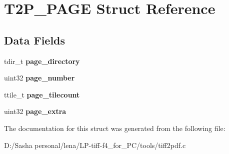 \hypertarget{struct_t2_p___p_a_g_e}{}\section{T2\+P\+\_\+\+P\+A\+G\+E Struct Reference}
\label{struct_t2_p___p_a_g_e}
\subsection*{Data Fields}
\begin{DoxyCompactItemize}
\item 
\hypertarget{struct_t2_p___p_a_g_e_a7df7149b509161de6a47a29b2ddf42d3}{}tdir\+\_\+t {\bfseries page\+\_\+directory}\label{struct_t2_p___p_a_g_e_a7df7149b509161de6a47a29b2ddf42d3}

\item 
\hypertarget{struct_t2_p___p_a_g_e_af5f8d04c2416529f3fe1f40c306dfa3b}{}uint32 {\bfseries page\+\_\+number}\label{struct_t2_p___p_a_g_e_af5f8d04c2416529f3fe1f40c306dfa3b}

\item 
\hypertarget{struct_t2_p___p_a_g_e_a6b85db7be288aca43218e10746cd5ce4}{}ttile\+\_\+t {\bfseries page\+\_\+tilecount}\label{struct_t2_p___p_a_g_e_a6b85db7be288aca43218e10746cd5ce4}

\item 
\hypertarget{struct_t2_p___p_a_g_e_a5fa32b5073d7163cd8ce36e835447eb0}{}uint32 {\bfseries page\+\_\+extra}\label{struct_t2_p___p_a_g_e_a5fa32b5073d7163cd8ce36e835447eb0}

\end{DoxyCompactItemize}


The documentation for this struct was generated from the following file\+:\begin{DoxyCompactItemize}
\item 
D\+:/\+Sasha personal/lena/\+L\+P-\/tiff-\/f4\+\_\+for\+\_\+\+P\+C/tools/tiff2pdf.\+c\end{DoxyCompactItemize}
